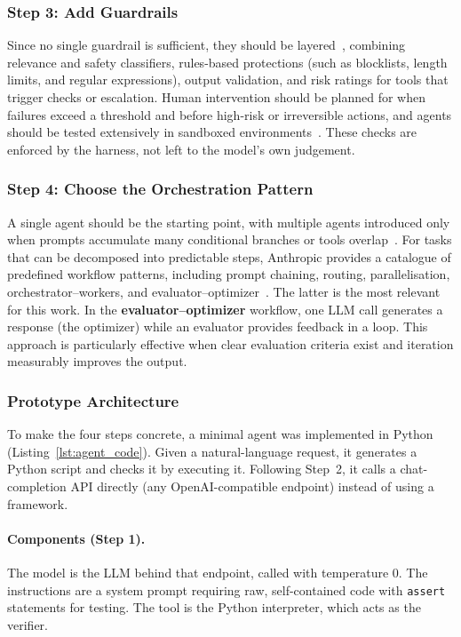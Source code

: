 \subsubsection{Step 3: Add Guardrails}
Since no single guardrail is sufficient, they should be layered~\cite{openai2025practical}, combining relevance and safety classifiers, rules-based protections (such as blocklists, length limits, and regular expressions), output validation, and risk ratings for tools that trigger checks or escalation. Human intervention should be planned for when failures exceed a threshold and before high-risk or irreversible actions, and agents should be tested extensively in sandboxed environments~\cite{anthropic2024building}. These checks are enforced by the harness, not left to the model's own judgement.
 
\subsubsection{Step 4: Choose the Orchestration Pattern}
A single agent should be the starting point, with multiple agents introduced only when prompts accumulate many conditional branches or tools overlap~\cite{openai2025practical}. For tasks that can be decomposed into predictable steps, Anthropic provides a catalogue of predefined workflow patterns, including prompt chaining, routing, parallelisation, orchestrator--workers, and evaluator--optimizer~\cite{anthropic2024building}. The latter is the most relevant for this work. In the \textbf{evaluator--optimizer} workflow, one LLM call generates a response (the optimizer) while an evaluator provides feedback in a loop. This approach is particularly effective when clear evaluation criteria exist and iteration measurably improves the output.
 
\subsubsection{Prototype Architecture}
\label{subsubsec:prototype}

To make the four steps concrete, a minimal agent was implemented in Python (Listing~\ref{lst:agent_code}). Given a natural-language request, it generates a Python script and checks it by executing it. Following Step~2, it calls a chat-completion API directly (any OpenAI-compatible endpoint) instead of using a framework.

\paragraph{Components (Step 1).} The model is the LLM behind that endpoint, called with temperature 0. The instructions are a system prompt requiring raw, self-contained code with \texttt{assert} statements for testing. The tool is the Python interpreter, which acts as the verifier.

